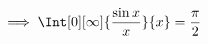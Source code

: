 \begin{solution}
\begin{enumerate}[label = \arabic*.]
    \begin{align*}
        \implies
        \Int[0][\infty]
        {
            \frac{\sin x}{x}
        }{x}
        =
        \frac{\pi}{2}
    \end{align*}

\end{enumerate}

\end{solution}

